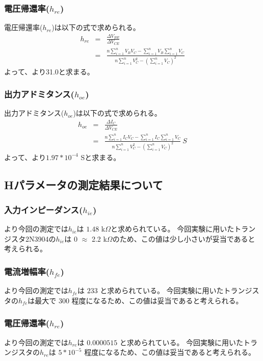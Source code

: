 \documentclass[11pt,dvipdfmx]{jarticle}
\begin{document}
		\subsubsection{電圧帰還率($h_{re}$)}
		電圧帰還率($h_{re}$)は以下の式で求められる。
		\begin{eqnarray}
			h_{re} &=& \frac{\Delta V_{BE}}{\Delta V_{CE}} \nonumber\\
			&=& \frac{n\sum_{i = 1}^{n}V_BV_C-\sum_{i = 1}^{n}V_B\sum_{i = 1}^{n}V_C}{n\sum_{i = 1}^{n}V_C^2-(\sum_{i = 1}^{n}V_C)^2}
		\end{eqnarray}
		よって、より31.0と求まる。
		\subsubsection{出力アドミタンス($h_{oe}$)}
		出力アドミタンス($h_{oe}$)は以下の式で求められる。
		\begin{eqnarray}
			h_{oe} &=& \frac{\Delta I_C}{\Delta V_{CE}} \nonumber\\
			&=& \frac{n\sum_{i = 1}^{n}I_CV_C-\sum_{i = 1}^{n}I_C\sum_{i = 1}^{n}V_C}{n\sum_{i = 1}^{n}V_C^2-(\sum_{i = 1}^{n}V_C)^2}\ S
			\end{eqnarray}
		よって、より$1.97*10^{-4}$ Sと求まる。
	\subsection{Hパラメータの測定結果について}
		\subsubsection{入力インピーダンス($h_{ie}$)}
		より今回の測定では$h_{ie}$は $1.48$ k$\Omega$と求められている。
		今回実験に用いたトランジスタ2N3904の$h_{ie}$は 0 $\approx$ 2.2 k$\Omega$のため、この値は少し小さいが妥当であると考えられる。
		\subsubsection{電流増幅率($h_{fe}$)}
		より今回の測定では$h_{fe}$は $233$ と求められている。
		今回実験に用いたトランジスタの$h_{fe}$は最大で 300 程度になるため、この値は妥当であると考えられる。
		\subsubsection{電圧帰還率($h_{re}$)}
		より今回の測定では$h_{re}$は $0.0000515$ と求められている。
		今回実験に用いたトランジスタの$h_{re}$は $5*10^{-5}$ 程度になるため、この値は妥当であると考えられる。
\end{document}
